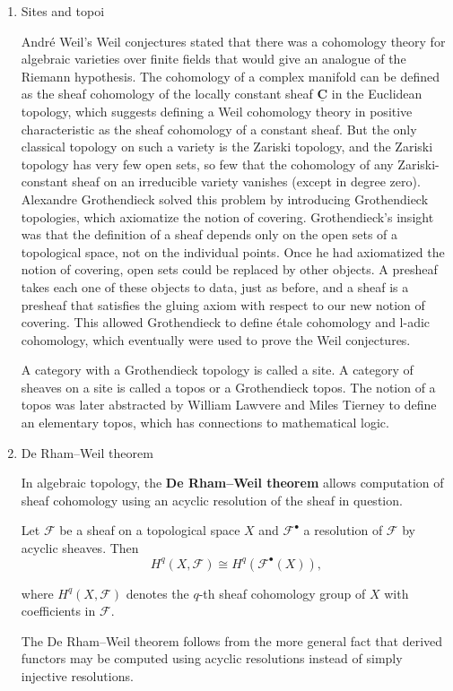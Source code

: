 \documentclass[UTF8]{ctexart}
\begin{document}
\begin{enumerate}
\item Sites and topoi\parencite{sites_and_topoi}

André Weil's Weil conjectures stated that there was a cohomology theory for algebraic varieties over finite fields that would give an analogue of the Riemann hypothesis. The cohomology of a complex manifold can be defined as the sheaf cohomology of the locally constant sheaf $\underline{\mathbf {C} }$ in the Euclidean topology, which suggests defining a Weil cohomology theory in positive characteristic as the sheaf cohomology of a constant sheaf. But the only classical topology on such a variety is the Zariski topology, and the Zariski topology has very few open sets, so few that the cohomology of any Zariski-constant sheaf on an irreducible variety vanishes (except in degree zero). Alexandre Grothendieck solved this problem by introducing Grothendieck topologies, which axiomatize the notion of covering. Grothendieck's insight was that the definition of a sheaf depends only on the open sets of a topological space, not on the individual points. Once he had axiomatized the notion of covering, open sets could be replaced by other objects. A presheaf takes each one of these objects to data, just as before, and a sheaf is a presheaf that satisfies the gluing axiom with respect to our new notion of covering. This allowed Grothendieck to define étale cohomology and l-adic cohomology, which eventually were used to prove the Weil conjectures.

A category with a Grothendieck topology is called a site. A category of sheaves on a site is called a topos or a Grothendieck topos. The notion of a topos was later abstracted by William Lawvere and Miles Tierney to define an elementary topos, which has connections to mathematical logic.

\item De Rham–Weil theorem\parencite{De_Rham_Weil_theorem}

In algebraic topology, the \textbf{De Rham–Weil theorem} allows computation of sheaf cohomology using an acyclic resolution of the sheaf in question.

Let $\mathcal{F}$ be a sheaf on a topological space $X$ and $\mathcal{F}^{\bullet}$ a resolution of $\mathcal{F}$ by acyclic sheaves. Then
\[
H^{q}(X,{\mathcal{F}})\cong H^{q}({\mathcal{F}}^{\bullet}(X)),
\]

where $H^{q}(X,{\mathcal {F}})$ denotes the $q$-th sheaf cohomology group of $X$ with coefficients in $\mathcal{F}$.

The De Rham–Weil theorem follows from the more general fact that derived functors may be computed using acyclic resolutions instead of simply injective resolutions.
\end{enumerate}
\end{document}
